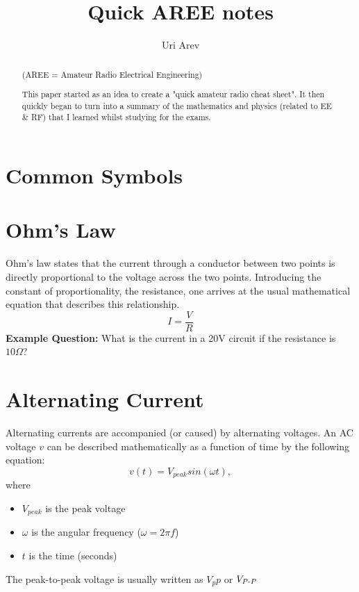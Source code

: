 \documentclass[12pt,a4paper,oneside]{article}
\author{Uri Arev}
\title{Quick AREE notes}
\date{}
\begin{document}
\maketitle
\tableofcontents
\begin{abstract}
	\begin{center}
		(AREE = Amateur Radio Electrical Engineering)
	\end{center}

	This paper started as an idea to create a "quick amateur radio cheat sheet". It then quickly began to turn into a summary of the mathematics and physics (related to EE \& RF) that I learned whilst studying for the exams.
\end{abstract}
\section{Common Symbols}
\begin{itemize}
	\item \Large{\(j = \sqrt{-1}\), \(j\) in electrical engineering is the same as \(i\) in normal mat
\end{itemize}
\section{Ohm's Law}
Ohm's law states that the current through a conductor between two points is directly proportional to the voltage across the two points. Introducing the constant of proportionality, the resistance, one arrives at the usual mathematical equation that describes this relationship.
\[
	I = \frac VR
\]
\textbf{Example Question:} What is the current in a 20V circuit if the resistance is \(10\Omega\)?
\section{Alternating Current}
Alternating currents are accompanied (or caused) by alternating voltages. An AC voltage \(v\) can be described mathematically as a function of time by the following equation:
\[
	v(t) = V_{peak} sin(\omega t),
\]
where
\begin{itemize}
	\item \(V_{peak}\) is the peak voltage
	\item \(\omega\) is the angular frequency (\(\omega = 2 \pi f\))
	\item \(t\) is the time (seconds)
\end{itemize}

The peak-to-peak voltage is usually written as \(V_pp\) or \(V_{P\text-P}\)
\end{document}
